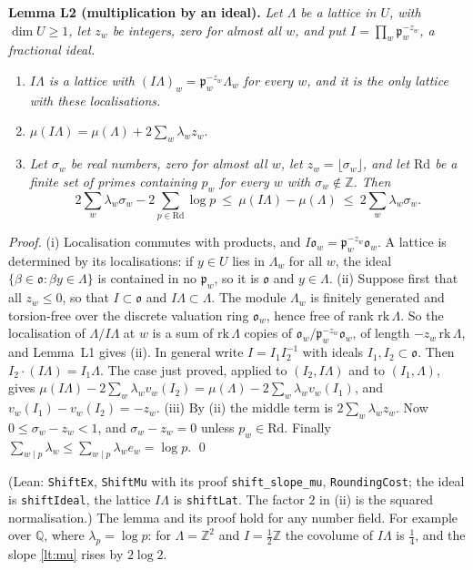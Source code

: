 \documentclass[11pt,letterpaper]{article}
\newcommand{\Z}{\mathbb Z}\newcommand{\Q}{\mathbb Q}\newcommand{\C}{\mathbb C}
\begin{document}
\textbf{Lemma L2 (multiplication by an ideal).} \emph{Let $\Lambda$ be a lattice in $U$, with
$\dim U\ge1$, let $z_w$ be
integers, zero for almost all $w$, and put $I=\prod_w\mathfrak p_w^{-z_w}$, a fractional ideal.}
\begin{enumerate}[label=\textup{(\roman*)},leftmargin=2.4em,itemsep=1pt,topsep=2pt]
\item \emph{$I\Lambda$ is a lattice with $(I\Lambda)_w=\mathfrak p_w^{-z_w}\Lambda_w$ for every $w$, and it
is the only lattice with these localisations.}
\item $\mu(I\Lambda)=\mu(\Lambda)+2\sum_w\lambda_wz_w$.
\item \emph{Let $\sigma_w$ be real numbers, zero for almost all $w$, let $z_w=\lfloor\sigma_w\rfloor$, and
let $\mathrm{Rd}$ be a finite set of primes containing $p_w$ for every $w$ with $\sigma_w\notin\Z$. Then}
\begin{equation}\label{lt:round}
 2\sum_w\lambda_w\sigma_w-2\sum_{p\in\mathrm{Rd}}\log p\ \le\ \mu(I\Lambda)-\mu(\Lambda)\ \le\ 2\sum_w\lambda_w\sigma_w .
\end{equation}
\end{enumerate}
\emph{Proof.} (i) Localisation commutes with products, and $I\mathfrak o_w=\mathfrak p_w^{-z_w}\mathfrak o_w$.
A lattice is determined by its localisations: if $y\in U$ lies in $\Lambda_w$ for all $w$, the ideal
$\{\beta\in\mathfrak o:\beta y\in\Lambda\}$ is contained in no $\mathfrak p_w$, so it is $\mathfrak o$ and
$y\in\Lambda$. (ii) Suppose first that all $z_w\le0$, so that $I\subset\mathfrak o$ and
$I\Lambda\subset\Lambda$. The module $\Lambda_w$ is finitely generated and torsion-free over the
discrete valuation ring $\mathfrak o_w$, hence free of rank $\mathrm{rk}\,\Lambda$. So the localisation
of $\Lambda/I\Lambda$ at $w$ is a sum of $\mathrm{rk}\,\Lambda$ copies of
$\mathfrak o_w/\mathfrak p_w^{-z_w}\mathfrak o_w$, of length $-z_w\,\mathrm{rk}\,\Lambda$, and Lemma~L1
gives (ii). In general write $I=I_1I_2^{-1}$ with ideals $I_1,I_2\subset\mathfrak o$. Then
$I_2\cdot(I\Lambda)=I_1\Lambda$. The case just proved, applied to $(I_2,I\Lambda)$ and to $(I_1,\Lambda)$,
gives $\mu(I\Lambda)-2\sum_w\lambda_wv_w(I_2)=\mu(\Lambda)-2\sum_w\lambda_wv_w(I_1)$, and
$v_w(I_1)-v_w(I_2)=-z_w$. (iii) By (ii) the middle term is $2\sum_w\lambda_wz_w$. Now
$0\le\sigma_w-z_w<1$, and $\sigma_w-z_w=0$ unless $p_w\in\mathrm{Rd}$. Finally
$\sum_{w\mid p}\lambda_w\le\sum_{w\mid p}\lambda_we_w=\log p$. \qed

\noindent (Lean: \texttt{ShiftEx}, \texttt{ShiftMu} with its proof \texttt{shift\_slope\_mu},
\texttt{RoundingCost}; the ideal is \texttt{shiftIdeal}, the lattice $I\Lambda$ is \texttt{shiftLat}. The
factor $2$ in (ii) is the squared normalisation.) The lemma and its proof hold for any number field. For
example over $\Q$, where $\lambda_p=\log p$: for $\Lambda=\Z^2$ and $I=\frac12\Z$ the covolume of
$I\Lambda$ is $\frac14$, and the slope \eqref{lt:mu} rises by $2\log2$.
\end{document}
